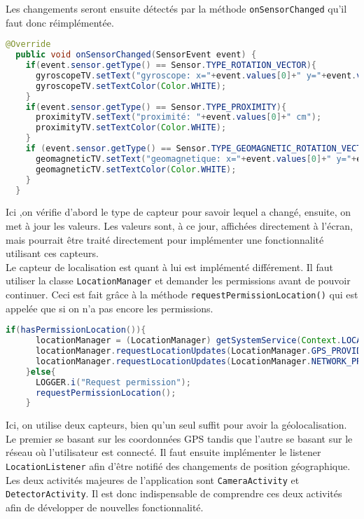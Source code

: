 \documentclass[UTF8]{EPURapport}
\begin{document}
Les changements seront ensuite détectés par la méthode \verb|onSensorChanged| qu'il faut donc réimplémentée.\\

\begin{lstlisting}[language=Java]
  @Override
  public void onSensorChanged(SensorEvent event) {
    if(event.sensor.getType() == Sensor.TYPE_ROTATION_VECTOR){
      gyroscopeTV.setText("gyroscope: x="+event.values[0]+" y="+event.values[1]+" z="+event.values[2]);
      gyroscopeTV.setTextColor(Color.WHITE);
    }
    if(event.sensor.getType() == Sensor.TYPE_PROXIMITY){
      proximityTV.setText("proximité: "+event.values[0]+" cm");
      proximityTV.setTextColor(Color.WHITE);
    }
    if (event.sensor.getType() == Sensor.TYPE_GEOMAGNETIC_ROTATION_VECTOR){
      geomagneticTV.setText("geomagnetique: x="+event.values[0]+" y="+event.values[1]+" z="+event.values[2]);
      geomagneticTV.setTextColor(Color.WHITE);
    }
  }
\end{lstlisting}

Ici ,on vérifie d'abord le type de capteur pour savoir lequel a changé, ensuite, on met à jour les valeurs. Les valeurs sont, à ce jour, affichées directement à l'écran, mais pourrait être traité directement pour implémenter une fonctionnalité utilisant ces capteurs. \\

Le capteur de localisation est quant à lui est implémenté différement. Il faut utiliser la classe \verb|LocationManager| et demander les permissions avant de pouvoir continuer. Ceci est fait grâce à la méthode \verb|requestPermissionLocation()| qui est appelée que si on n'a pas encore les permissions.

\begin{lstlisting}[language=Java]
if(hasPermissionLocation()){
      locationManager = (LocationManager) getSystemService(Context.LOCATION_SERVICE);
      locationManager.requestLocationUpdates(LocationManager.GPS_PROVIDER, 0, 0, this);
      locationManager.requestLocationUpdates(LocationManager.NETWORK_PROVIDER, 0, 0, this);
    }else{
      LOGGER.i("Request permission");
      requestPermissionLocation();
    }
\end{lstlisting}

Ici, on utilise deux capteurs, bien qu'un seul suffit pour avoir la géolocalisation. Le premier se basant sur les coordonnées GPS tandis que l'autre se basant sur le réseau où l'utilisateur est connecté. Il faut ensuite implémenter le listener \verb|LocationListener| afin d'être notifié des changements de position géographique.\\

Les deux activités majeures de l'application sont \verb|CameraActivity| et \verb|DetectorActivity|. Il est donc indispensable de comprendre ces deux activités afin de développer de nouvelles fonctionnalité.
\end{document}
